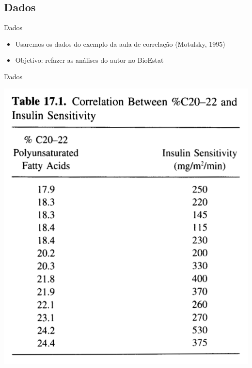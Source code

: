 \documentclass{beamer}
\begin{document}
\subsection{Dados}

\begin{frame}{Dados}
  \begin{itemize}
  \item Usaremos os dados do exemplo da aula de correlação (Motulsky, 1995)
  \item Objetivo: refazer as análises do autor no BioEstat
  \end{itemize}
\end{frame}


\begin{frame}{Dados}
  \begin{center}
    \includegraphics[height=0.9\textheight]{table}
  \end{center}
\end{frame}
\end{document}
